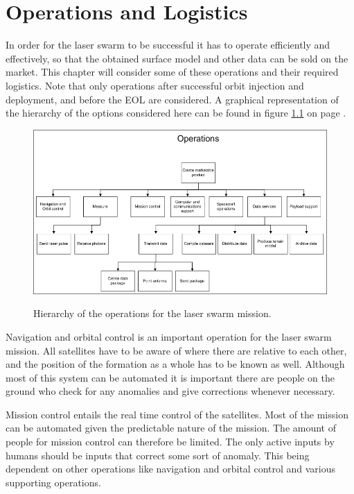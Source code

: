 \chapter{Operations and Logistics}
\label{MTROpsLog}

In order for the laser swarm to be successful it has to operate efficiently and effectively, so that the obtained surface model and other data can be sold on the market. This chapter will consider some of these operations and their required logistics. Note that only operations after successful orbit injection and deployment, and before the \ac{EOL} are considered. A graphical representation of the hierarchy of the options considered here can be found in figure \ref{fig:MTROpsLog} on page \pageref{fig:MTROpsLog}.

\begin{figure}
\centering
\includegraphics[width=1.0\textwidth, angle=0]{chapters/img/MTROpsHier.png}
\label{fig:MTROpsLog}
\caption{Hierarchy of the operations for the laser swarm mission.}
\end{figure}

Navigation and orbital control is an important operation for the laser swarm mission. All satellites have to be aware of where there are relative to each other, and the position of the formation as a whole has to be known as well. Although most of this system can be automated it is important there are people on the ground who check for any anomalies and give corrections whenever necessary.

Mission control entails the real time control of the satellites. Most of the mission can be automated given the predictable nature of the mission. The amount of people for mission control can therefore be limited. The only active inputs by humans should be inputs that correct some sort of anomaly. This being dependent on other operations like navigation and orbital control and various supporting operations.

